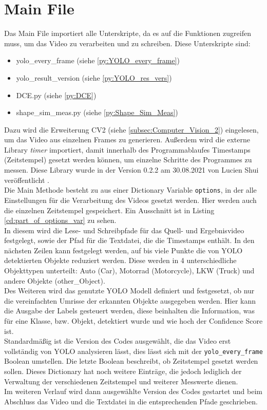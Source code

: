 \section{Main File}
{ 
	Das Main File importiert alle Unterskripte, da es auf die Funktionen zugreifen muss, um das Video zu verarbeiten und zu schreiben. Diese Unterskripte sind: 
	\begin{itemize}
		\item yolo\_every\_frame (siehe \ref{py:YOLO_every_frame})
		\item yolo\_result\_version (siehe \ref{py:YOLO_res_vers})
		\item DCE.py (siehe \ref{py:DCE})
		\item shape\_sim\_meas.py (siehe \ref{py:Shape_Sim_Meas})
	\end{itemize}
	Dazu wird die Erweiterung CV2 (siehe \ref{subsec:Computer_Vision_2}) eingelesen, um das Video aus einzelnen Frames zu generieren.
	Außerdem wird die externe Library \textit{timer} importiert, damit innerhalb des Programmablaufes Timestamps (Zeitstempel) gesetzt werden können, um einzelne Schritte des Programmes zu messen. Diese Library wurde in der Version 0.2.2 am 30.08.2021 von Lucien Shui veröffentlicht \citep{Shui2021}.  \\
	Die Main Methode besteht zu aus einer Dictionary Variable \lstinline|options|, in der alle Einstellungen für die Verarbeitung des Videos gesetzt werden. Hier werden auch die einzelnen Zeitstempel gespeichert. Ein Ausschnitt ist in Listing \ref{cd:part_of_options_var} zu sehen. \\
	In diesem wird die Lese- und Schreibpfade für das Quell- und Ergebnisvideo festgelegt, sowie der Pfad für die Textdatei, die die Timestamps enthält. In den nächsten Zeilen kann festgelegt werden, auf bis viele Punkte die von YOLO detektierten Objekte reduziert werden. Diese werden in 4 unterschiedliche Objekttypen unterteilt: Auto (Car), Motorrad (Motorcycle), LKW (Truck) und andere Objekte (other\_Object). \\
	Des Weiteren wird das genutzte YOLO Modell definiert und festgesetzt, ob nur die vereinfachten Umrisse der erkannten Objekte ausgegeben werden. Hier kann die Ausgabe der Labels gesteuert werden, diese beinhalten die Information, was für eine Klasse, bzw. Objekt, detektiert wurde und wie hoch der Confidence Score ist. \\
	Standardmäßig ist die Version des Codes ausgewählt, die das Video erst vollständig von YOLO analysieren lässt, dies lässt sich mit der \lstinline|yolo_every_frame| Boolean umstellen. Die letzte Boolean beschreibt, ob Zeitstempel gesetzt werden sollen. Dieses Dictionary hat noch weitere Einträge, die jedoch lediglich der Verwaltung der verschiedenen Zeitstempel und weiterer Messwerte dienen. \\
	

	Im weiteren Verlauf wird dann ausgewählte Version des Codes gestartet und beim Abschluss das Video und die Textdatei in die entsprechenden Pfade geschrieben.
}
